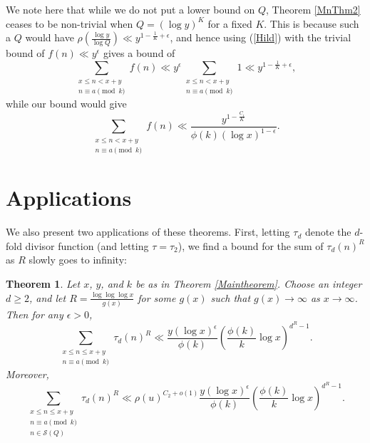 \documentclass{amsart}
\newtheorem{theorem}{Theorem}[section]
\newtheorem*{varthmHilcor}{Corollary {\ref{Hilcor}}}
\begin{document}
We note here that while we do not put a lower bound on $Q$, Theorem \ref{MnThm2} ceases to be non-trivial when $Q=(\log y)^K$ for a fixed $K$.  This is because such a $Q$ would have $\rho\left(\frac{\log y}{\log Q}\right)\ll y^{1-\frac{1}{K}+\epsilon}$, and hence using (\ref{Hild}) with the trivial bound of $f(n)\ll y^\epsilon$ gives a bound of
$$\sum_{\substack{x\leq n<x+y \\ n\equiv a\pmod k}}f(n)\ll y^\epsilon\sum_{\substack{x\leq n<x+y \\ n\equiv a\pmod k}}1\ll y^{1-\frac 1K+\epsilon},$$
while our bound would give
$$\sum_{\substack{x\leq n<x+y \\ n\equiv a\pmod k}}f(n)\ll \frac{y^{1-\frac{C_i}K}}{\phi(k)(\log x)^{1-\epsilon}}.$$

\section{Applications}

We also present two applications of these theorems.  First, letting $\tau_d$ denote the $d$-fold divisor function (and letting $\tau=\tau_2$), we find a bound for the sum of $\tau_d(n)^R$ as $R$ slowly goes to infinity:

\begin{theorem}\label{dfold}
Let $x$, $y$, and $k$ be as in Theorem \ref{Maintheorem}.  Choose an integer $d\geq 2$, and let $R=\frac{\log\log\log x}{g(x)}$ for some $g(x)$ such that $g(x)\to\infty$ as $x\to\infty$.  Then for any $\epsilon>0$,
$$\sum_{\substack{x\leq n\leq x+y \\ n\equiv a\pmod k}}\tau_d(n)^{R}\ll \frac{y(\log x)^\epsilon}{\phi(k)}\left(\frac{\phi(k)}{k}\log x\right)^{d^{R}-1}.$$
Moreover,
$$\sum_{\substack{x\leq n\leq x+y \\ n\equiv a\pmod k \\ n\in \mathcal S(Q)}}\tau_d(n)^{R}\ll \rho(u)^{C_2+o(1)}\frac{y(\log x)^\epsilon}{\phi(k)}\left(\frac{\phi(k)}{k}\log x\right)^{d^{R}-1}.$$
\end{theorem}
\end{document}
